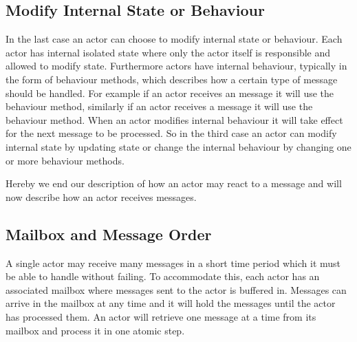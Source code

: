 \subsection{Modify Internal State or Behaviour}
In the last case an actor can choose to modify internal state or behaviour. Each actor has internal isolated state where only the actor itself is responsible and allowed to modify state. Furthermore actors have internal behaviour, typically in the form of behaviour methods, which describes how a certain type of message should be handled. For example if an actor receives an  message it will use the  behaviour method, similarly  if an actor receives a  message it will use the  behaviour method. When an actor modifies internal behaviour it will take effect for the next message to be processed. So in the third case an actor can modify internal state by updating state or change the internal behaviour by changing one or more behaviour methods. 

Hereby we end our description of how an actor may react to a message and will now describe how an actor receives messages.

\subsection{Mailbox and Message Order}
A single actor may receive many messages in a short time period which it must be able to handle without failing. To accommodate this, each actor has an associated mailbox where messages sent to the actor is buffered in\cite[Chap. 2.6]{haller2012actors}. Messages can arrive in the mailbox at any time and it will hold the messages until the actor has processed them. An actor will retrieve one message at a time from its mailbox and process it in one atomic step\cite[p. 2]{karmani2009actor}.

